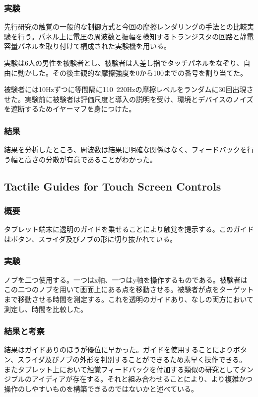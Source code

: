 \documentclass[11pt,a4paper]{jarticle}
\begin{document}
\subsubsection{実験}
先行研究の触覚の一般的な制御方式と今回の摩擦レンダリングの手法との比較実験を行う。パネル上に電圧の周波数と振幅を検知するトランジスタの回路と静電容量パネルを取り付けて構成された実験機を用いる。

実験は6人の男性を被験者とし、被験者は人差し指でタッチパネルをなぞり、自由に動かした。その後主観的な摩擦強度を0から100までの番号を割り当てた。

被験者には10Hzずつに等間隔に110~220Hzの摩擦レベルをランダムに30回出現させた。実験前に被験者は評価尺度と導入の説明を受け、環境とデバイスのノイズを遮断するためイヤーマフを身につけた。

\subsubsection{結果}
結果を分析したところ、周波数は結果に明確な関係はなく、フィードバックを行う幅と高さの分散が有意であることがわかった。

\subsection{Tactile Guides for Touch Screen Controls}
\subsubsection{概要}
タブレット端末に透明のガイドを乗せることにより触覚を提示する。このガイドはボタン、スライダ及びノブの形に切り抜かれている。

\subsubsection{実験}
ノブを二つ使用する。一つはx軸、一つはy軸を操作するものである。被験者はこの二つのノブを用いて画面上にある点を移動させる。被験者が点をターゲットまで移動させる時間を測定する。これを透明のガイドあり、なしの両方において測定し、時間を比較した。


\subsubsection{結果と考察}
結果はガイドありのほうが優位に早かった。ガイドを使用することによりボタン、スライダ及びノブの外形を判別することができるため素早く操作できる。
またタブレット上において触覚フィードバックを付加する類似の研究としてタンジブルのアイディアが存在する。それと組み合わせることにより、より複雑かつ操作のしやすいものを構築できるのではないかと述べている。
\end{document}
